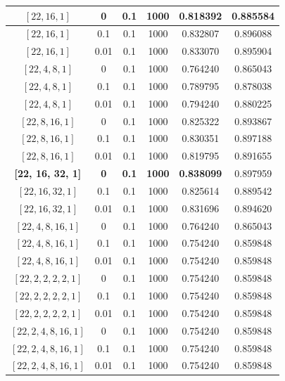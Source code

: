 \documentclass{article}
\begin{document}
\begin{enumerate}
\begin{table}[H]
\begin{tabular}{|c|c|c|c|c|c|}
$[22, 16, 1]$ & 0    & 0.1 & 1000 & 0.818392 & 0.885584 \\ \hline
$[22, 16, 1]$ & 0.1  & 0.1 & 1000 & 0.832807 & 0.896088 \\ \hline
$[22, 16, 1]$ & 0.01 & 0.1 & 1000 & 0.833070 & 0.895904 \\ \hline

$[22, 4, 8, 1]$ & 0    & 0.1 & 1000 & 0.764240 & 0.865043 \\ \hline
$[22, 4, 8, 1]$ & 0.1  & 0.1 & 1000 & 0.789795 & 0.878038 \\ \hline
$[22, 4, 8, 1]$ & 0.01 & 0.1 & 1000 & 0.794240 & 0.880225 \\ \hline

$[22, 8, 16, 1]$ & 0    & 0.1 & 1000 & 0.825322 & 0.893867 \\ \hline
$[22, 8, 16, 1]$ & 0.1  & 0.1 & 1000 & 0.830351 & 0.897188 \\ \hline
$[22, 8, 16, 1]$ & 0.01 & 0.1 & 1000 & 0.819795 & 0.891655 \\ \hline

\textbf{[22, 16, 32, 1]} & \textbf{0}    & \textbf{0.1} & \textbf{1000} & \textbf{0.838099} & 0.897959 \\ \hline
$[22, 16, 32, 1]$ & 0.1  & 0.1 & 1000 & 0.825614 & 0.889542 \\ \hline
$[22, 16, 32, 1]$ & 0.01 & 0.1 & 1000 & 0.831696 & 0.894620 \\ \hline

$[22, 4, 8, 16, 1]$ & 0    & 0.1 & 1000 & 0.764240 & 0.865043 \\ \hline
$[22, 4, 8, 16, 1]$ & 0.1  & 0.1 & 1000 & 0.754240 & 0.859848 \\ \hline
$[22, 4, 8, 16, 1]$ & 0.01 & 0.1 & 1000 & 0.754240 & 0.859848 \\ \hline

$[22, 2, 2, 2, 2, 1]$ & 0    & 0.1 & 1000 & 0.754240 & 0.859848 \\ \hline
$[22, 2, 2, 2, 2, 1]$ & 0.1  & 0.1 & 1000 & 0.754240 & 0.859848 \\ \hline
$[22, 2, 2, 2, 2, 1]$ & 0.01 & 0.1 & 1000 & 0.754240 & 0.859848 \\ \hline

$[22, 2, 4, 8, 16, 1]$ & 0    & 0.1 & 1000 & 0.754240 & 0.859848 \\ \hline
$[22, 2, 4, 8, 16, 1]$ & 0.1  & 0.1 & 1000 & 0.754240 & 0.859848 \\ \hline
$[22, 2, 4, 8, 16, 1]$ & 0.01 & 0.1 & 1000 & 0.754240 & 0.859848 \\ \hline


\end{tabular}
\end{table}
\end{enumerate}
\end{document}
